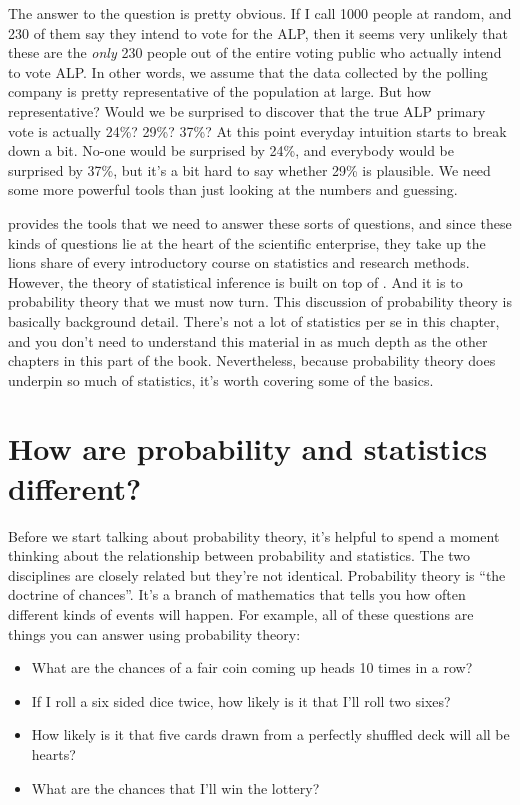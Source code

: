 The answer to the question is pretty obvious. If I call 1000 people at random, and 230 of them say they intend to vote for the ALP, then it seems very unlikely that these are the {\it only} 230 people out of the entire voting public who actually intend to vote ALP. In other words, we assume that the data collected by the polling company is pretty representative of the population at large. But how representative? Would we be surprised to discover that the true ALP primary vote is actually 24\%? 29\%? 37\%? At this point everyday intuition starts to break down a bit. No-one would be surprised by 24\%, and everybody would be surprised by 37\%, but it's a bit hard to say whether 29\% is plausible. We need some more powerful tools than just looking at the numbers and guessing.

 provides the tools that we need to answer these sorts of questions, and since these kinds of questions lie at the heart of the scientific enterprise, they take up the lions share of every introductory course on statistics and research methods. However, the theory of statistical inference is built on top of . And it is to probability theory that we must now turn. This discussion of probability theory is basically background detail. There's not a lot of statistics per se in this chapter, and you don't need to understand this material in as much depth as the other chapters in this part of the book. Nevertheless, because probability theory does underpin so much of statistics, it's worth covering some of the basics. 


\section{How are probability and statistics different?~\label{sec:probstats}}

Before we start talking about probability theory, it's helpful to spend a moment thinking about the relationship between probability and statistics. The two disciplines are closely related but they're not identical. Probability theory is ``the doctrine of chances''. It's a branch of mathematics that tells you how often different kinds of events will happen. For example, all of these questions are things you can answer using probability theory:

\begin{itemize} \itemsep -2pt
\item What are the chances of a fair coin coming up heads 10 times in a row?
\item If I roll a six sided dice twice, how likely is it that I'll roll two sixes?
\item How likely is it that five cards drawn from a perfectly shuffled deck will all be hearts?
\item What are the chances that I'll win the lottery?
\end{itemize}

